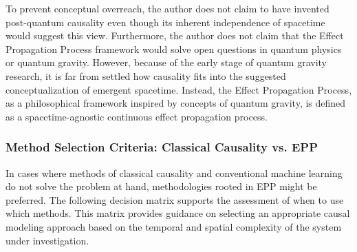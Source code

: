\documentclass{article}
\begin{document}
To prevent conceptual overreach, the author does not claim to have invented post-quantum causality even though its inherent independence of spacetime would suggest this view. Furthermore, the author does not claim that the Effect Propagation Process framework would solve open questions in quantum physics or quantum gravity. However, because of the early stage of quantum gravity research, it is far from settled how causality fits into the suggested conceptualization of emergent spacetime. Instead, the Effect Propagation Process, as a philosophical framework inspired by concepts of quantum gravity, is defined as a spacetime-agnostic continuous effect propagation process.

\subsubsection{Method Selection Criteria: Classical Causality vs. EPP}

In cases where methods of classical causality and conventional machine learning do not solve the problem at hand, methodologies rooted in EPP might be preferred. The following decision matrix supports the assessment of when to use which methods. This matrix provides guidance on selecting an appropriate causal modeling approach based on the temporal and spatial complexity of the system under investigation.
\end{document}
